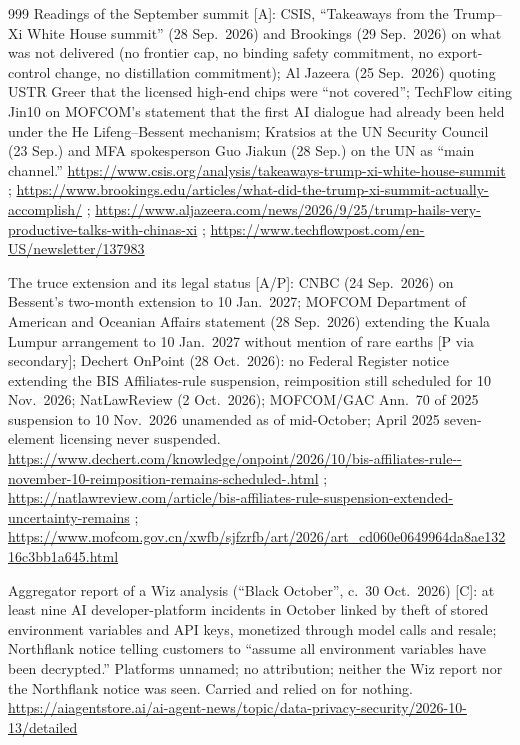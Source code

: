 \begin{thebibliography}{999}
 Readings of the September summit [A]: CSIS, ``Takeaways from the Trump--Xi White House summit'' (28 Sep.\ 2026) and Brookings (29 Sep.\ 2026) on what was not delivered (no frontier cap, no binding safety commitment, no export-control change, no distillation commitment); Al Jazeera (25 Sep.\ 2026) quoting USTR Greer that the licensed high-end chips were ``not covered''; TechFlow citing Jin10 on MOFCOM's statement that the first AI dialogue had already been held under the He Lifeng--Bessent mechanism; Kratsios at the UN Security Council (23 Sep.) and MFA spokesperson Guo Jiakun (28 Sep.) on the UN as ``main channel.'' \url{https://www.csis.org/analysis/takeaways-trump-xi-white-house-summit} ; \url{https://www.brookings.edu/articles/what-did-the-trump-xi-summit-actually-accomplish/} ; \url{https://www.aljazeera.com/news/2026/9/25/trump-hails-very-productive-talks-with-chinas-xi} ; \url{https://www.techflowpost.com/en-US/newsletter/137983}

 The truce extension and its legal status [A/P]: CNBC (24 Sep.\ 2026) on Bessent's two-month extension to 10 Jan.\ 2027; MOFCOM Department of American and Oceanian Affairs statement (28 Sep.\ 2026) extending the Kuala Lumpur arrangement to 10 Jan.\ 2027 without mention of rare earths [P via secondary]; Dechert OnPoint (28 Oct.\ 2026): no Federal Register notice extending the BIS Affiliates-rule suspension, reimposition still scheduled for 10 Nov.\ 2026; NatLawReview (2 Oct.\ 2026); MOFCOM/GAC Ann.\ 70 of 2025 suspension to 10 Nov.\ 2026 unamended as of mid-October; April 2025 seven-element licensing never suspended. \url{https://www.dechert.com/knowledge/onpoint/2026/10/bis-affiliates-rule--november-10-reimposition-remains-scheduled-.html} ; \url{https://natlawreview.com/article/bis-affiliates-rule-suspension-extended-uncertainty-remains} ; \url{https://www.mofcom.gov.cn/xwfb/sjfzrfb/art/2026/art_cd060e0649964da8ae13216c3bb1a645.html}

 Aggregator report of a Wiz analysis (``Black October'', c.\ 30 Oct.\ 2026) [C]: at least nine AI developer-platform incidents in October linked by theft of stored environment variables and API keys, monetized through model calls and resale; Northflank notice telling customers to ``assume all environment variables have been decrypted.'' Platforms unnamed; no attribution; neither the Wiz report nor the Northflank notice was seen. Carried and relied on for nothing. \url{https://aiagentstore.ai/ai-agent-news/topic/data-privacy-security/2026-10-13/detailed}


\end{thebibliography}
